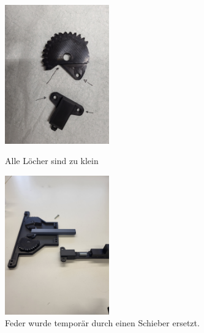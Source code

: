 \documentclass[../main.tex]{subfiles}
\begin{document}
\begin{figure}[h!]
    \centering
    \begin{minipage}[t]{0.45\textwidth}
        \centering
        \includegraphics[height=6cm]{img/greifarmtest/prototyp_test_loecher.jpeg}
        \caption{Alle Löcher sind zu klein}
        \label{fig:hardware_test_loecher}
    \end{minipage}%
    \hfill
    \begin{minipage}[t]{0.45\textwidth}
        \centering
        \includegraphics[height=6cm]{img/greifarmtest/prototyp_test_schieber.jpeg}
        \caption{Feder wurde temporär durch einen Schieber ersetzt.}
        \label{fig:hardware_test_schieber}
    \end{minipage}
\end{figure}
\end{document}
